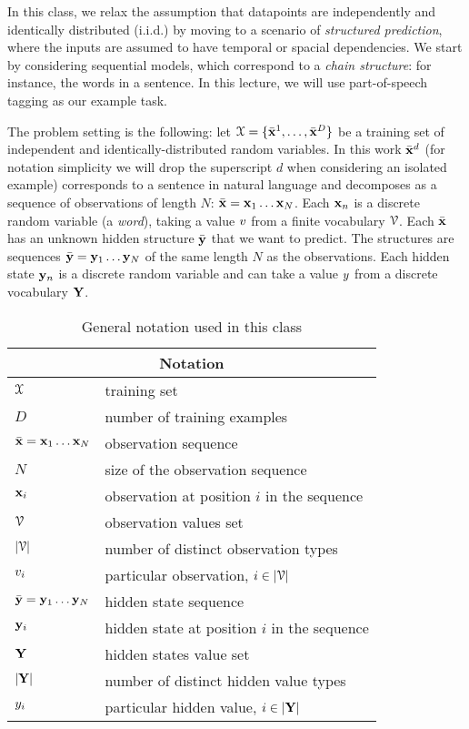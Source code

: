 

In this class, we relax the assumption that
datapoints are independently and identically distributed (i.i.d.) 
by moving to a scenario of \emph{structured prediction}, where the inputs are assumed to have
temporal or spacial dependencies. We start by 
considering sequential models, which correspond to a \emph{chain structure}: for instance,
the words in a sentence. In this lecture, we will use part-of-speech
tagging as our example task.  

The problem setting is the following:
let $\mathcal{X} = \{\bar{\mathbf{x}}^1, \ldots, \bar{\mathbf{x}}^D\}$ be a training set of independent
and identically-distributed random variables. In this work $\bar{\mathbf{x}}^d$
(for notation simplicity we will drop the superscript $d$ when
considering an isolated example) corresponds to a sentence in natural
language and decomposes as a sequence of observations of length $N$: $\bar{\mathbf{x}} = \mathbf{x}_1 \ldots
\mathbf{x}_N$. Each $\mathbf{x}_n$ is a discrete
random variable (a \emph{word}),  taking a value ${v}$ from a
finite vocabulary $\mathcal{V}$. Each $\bar{\mathbf{x}}$ has an unknown hidden
structure $\bar{\mathbf{y}}$  that we want to predict. The
structures are sequences $\bar{\mathbf{y}} = \mathbf{y}_1 \ldots \mathbf{y}_N$ of the same
length $N$ as the observations. Each hidden state $\mathbf{y}_n$ is a discrete
random variable and can take a value ${y}$ from a discrete vocabulary $\mathbf{Y}$. 

\begin{table}[h]
\begin{center}
\begin{tabular}{|l|l|}
\hline
\multicolumn{2}{|c|}{Notation}\\
\hline
\hline
$\mathcal{X}$ & training set \\
\hline
$D$  & number of training examples \\
\hline
$\bar{\mathbf{x}} = \mathbf{x}_1 \ldots \mathbf{x}_N$  & observation sequence \\
\hline
$N  $& size of the observation sequence \\
\hline
$\mathbf{x}_i$ &  observation at position $i$ in the sequence\\
\hline
$\mathcal{V}$ & observation values set\\
\hline 
$|\mathcal{V}|$ & number of distinct observation types\\
\hline 
${v}_i$ & particular observation, $i \in |\mathcal{V}|$\\
\hline 
$\bar{\mathbf{y}} = \mathbf{y}_1 \ldots \mathbf{y}_N$  & hidden state sequence \\
\hline
$\mathbf{y}_i$ &  hidden state at position $i$ in the sequence\\
\hline
$\mathbf{Y}$ & hidden states value set \\
\hline
$|\mathbf{Y}|$ & number of distinct hidden value types \\
\hline
${y}_i$ & particular hidden value, $i \in |\mathbf{Y}|$\\
\hline 
\end{tabular}
\end{center}
\caption{General notation used in this class}
\end{table}

